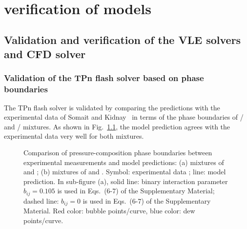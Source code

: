 \chapter{verification of models}
\label{verifi_chapter}

\section{Validation and verification of the VLE solvers and CFD solver} \label{App:vali}


    \subsection{Validation of the TPn flash solver based on phase boundaries}
    The TPn flash solver is validated by comparing the predictions with the experimental data of Somait and Kidnay~\cite{somait1978liquid} in terms of the phase boundaries of / and / mixtures. As shown in Fig.~\ref{v1}, the model prediction agrees with the experimental data very well for both mixtures.
    \begin{figure}[htbp]
        \centering
        \caption{Comparison of pressure-composition phase boundaries between experimental measurements and model predictions: (a) mixtures of  and ; (b) mixtures of  and . Symbol: experimental data \citep{somait1978liquid}; line: model prediction. In sub-figure (a), solid line: binary interaction parameter $b_{ij}=0.105$ is used in Eqs.~(6-7) of the Supplementary Material; dashed line: $b_{ij}=0$ is used in Eqs.~(6-7) of the Supplementary Material. Red color: bubble points/curve, blue color: dew points/curve.}
        \label{v1}
    \end{figure}

